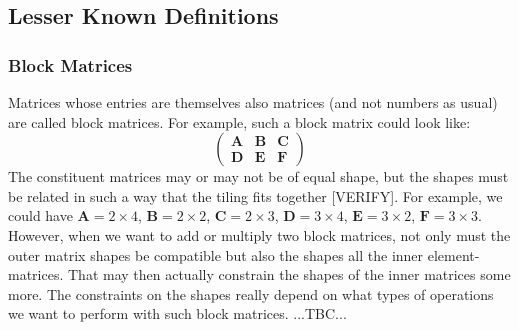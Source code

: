 









\subsection{Lesser Known Definitions}

\subsubsection{Block Matrices}
Matrices whose entries are themselves also matrices (and not numbers as usual) are called block matrices. For example, such a block matrix could look like:
\begin{equation}
\begin{pmatrix}
\mathbf{A} & \mathbf{B} & \mathbf{C} \\
\mathbf{D} & \mathbf{E} & \mathbf{F} 
\end{pmatrix}
\end{equation}
The constituent matrices may or may not be of equal shape, but the shapes must be related in such a way that the tiling fits together [VERIFY]. For example, we could have $\mathbf{A} = 2 \times 4$,  $\mathbf{B} = 2 \times 2$, $\mathbf{C} = 2 \times 3$, $\mathbf{D} = 3 \times 4$, $\mathbf{E} = 3 \times 2$, $\mathbf{F} = 3 \times 3$. However, when we want to add or multiply two block matrices, not only must the outer matrix shapes be compatible but also the shapes all the inner element-matrices. That may then actually constrain the shapes of the inner matrices some more. The constraints on the shapes really depend on what types of operations we want to perform with such block matrices. ...TBC...

